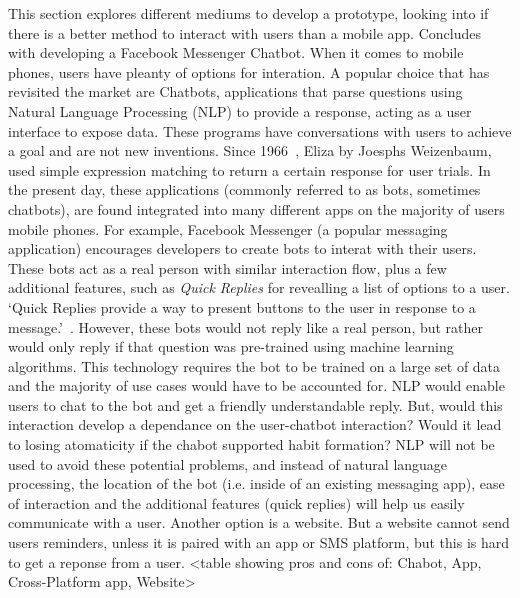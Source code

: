 This section explores different mediums to develop a prototype, looking into if there is a better method to interact with users than a mobile app. Concludes with developing a Facebook Messenger Chatbot.\newline
\newline
When it comes to mobile phones, users have pleanty of options for interation. A popular choice that has revisited the market are Chatbots, applications that parse questions using Natural Language Processing (NLP) to provide a response, acting as a user interface to expose data. These programs have conversations with users to achieve a goal and are not new inventions. Since 1966~\cite{article_eliza}, Eliza by Joesphs Weizenbaum, used simple expression matching to return a certain response for user trials. In the present day, these applications (commonly referred to as bots, sometimes chatbots), are found integrated into many different apps on the majority of users mobile phones. For example, Facebook Messenger (a popular messaging application) encourages developers to create bots to interat with their users. These bots act as a real person with similar interaction flow, plus a few additional features, such as \textit{Quick Replies} for revealling a list of options to a user. `Quick Replies provide a way to present buttons to the user in response to a message.'~\cite{doc_fb_quick_replies}. However, these bots would not reply like a real person, but rather would only reply if that question was pre-trained using machine learning algorithms. This technology requires the bot to be trained on a large set of data and the majority of use cases would have to be accounted for.\newline
\newline
NLP would enable users to chat to the bot and get a friendly understandable reply. But, would this interaction develop a dependance on the user-chatbot interaction? Would it lead to losing atomaticity if the chabot supported habit formation? NLP will not be used to avoid these potential problems, and instead of natural language processing, the location of the bot (i.e. inside of an existing messaging app), ease of interaction and the additional features (quick replies) will help us easily communicate with a user.\newline
\newline
Another option is a website. But a website cannot send users reminders, unless it is paired with an app or SMS platform, but this is hard to get a reponse from a user.\newline
\newline
<table showing pros and cons of: Chabot, App, Cross-Platform app, Website>\newline

